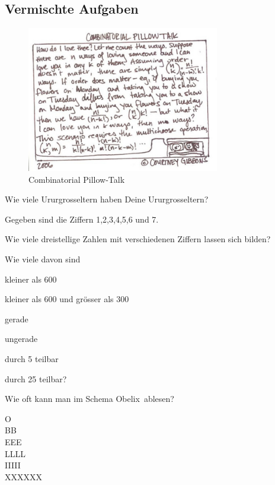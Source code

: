 \documentclass[%
11pt,%
twoside,%
titlepage,%
german,%
headsepline%
]{scrartcl}
\begin{document}
\subsection{Vermischte Aufgaben}

\begin{figure}
\begin{center}
\includegraphics[width=0.75\textwidth]{pictures/pillowtalk}
\caption{Combinatorial Pillow-Talk}
\end{center}
\end{figure}

\begin{ueb}[Urgrosselter]
 Wie viele Ururgrosseltern haben Deine Ururgrosseltern?
 \end{ueb}
 
 \begin{ueb}[Dreisteller]
 Gegeben sind die Ziffern 1,2,3,4,5,6 und 7.
 \begin{enumeratea}
 \item Wie viele dreistellige Zahlen mit verschiedenen
Ziffern lassen sich bilden?
 \end{enumeratea}
 Wie viele davon sind
 \begin{enumeratea}
 \addtocounter{enumi}{1}
 \item kleiner als 600
 \item kleiner als 600 und grösser als 300
 \item gerade
 \item ungerade
 \item durch 5 teilbar
 \item durch 25 teilbar?
 \end{enumeratea}
 \end{ueb}
 
 \begin{ueb}[Obelix]
 Wie oft kann man im Schema \glqq Obelix\grqq\ ablesen?
 \begin{center}
 \ttfamily
 O\\
 B\q B\\
 E\q E\q E\\
 L\q L\q L\q L\\
 I\q I\q I\q I\q I\q\\
 X\q X\q X\q X\q X\q X
 \end{center}
 \end{ueb}
\end{document}

